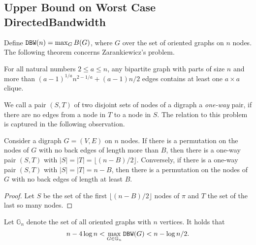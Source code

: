 \subsection{Upper Bound on Worst Case DirectedBandwidth}
\label{subsec:upper-bound-on-worst-case-directed-bandwidth}

Define $\mathtt{DBW}(n)=\max_{G}B(G)$, where $G$ over the set of oriented graphs on
$n$ nodes.
%
The following theorem concerns Zarankiewicz's problem.

\begin{theorem}
    \label{thm:zarankiewicz}

    For all natural numbers $2 \le a \le n$, any bipartite graph with parts of
    size $n$ and more than $(a - 1)^{1 / a} n^{2 - 1 / a} + (a - 1)n / 2$ edges contains at least one $a \times a$ clique.
\end{theorem}

We call a pair $(S,T)$ of two disjoint sets of nodes of a digraph a \emph{one-way} pair, if there are no edges from a node in $T$ to a node in
$S$.
%
The relation to this problem is captured in the following observation.

\begin{proposition}
    Consider a digraph $G=(V,E)$ on $n$ nodes.
    If there is a permutation on the nodes of $G$ with no back edges of length more than $B$, then there is a one-way pair $(S, T)$ with $|S| = |T| = \lfloor (n - B) / 2 \rfloor$.
    Conversely, if there is a one-way pair $(S, T)$ with $|S| = |T| = n - B$, then there is a permutation on the nodes of $G$ with no back edges of length
    at least $B$.
\end{proposition}

\begin{proof}
    Let $S$ be the set of the first $\lfloor{(n-B)}/{2}\rfloor$ nodes of $\pi$
    and $T$ the set of the last so many nodes.
\end{proof}

\begin{theorem}
    Let $\mathbb{G}_n$ denote the set of all oriented graphs with $n$ vertices.
    It holds that
    \[ n - 4\log n < \max_{G \in \mathbb{G}_n} \mathtt{DBW}(G) < n - \log n / 2. \]
\end{theorem}

